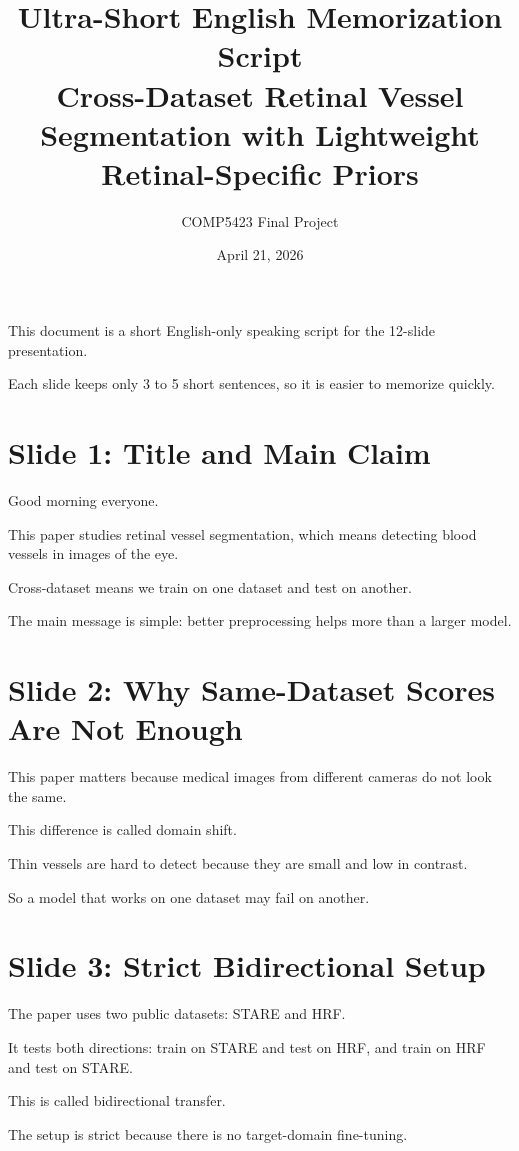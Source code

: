 \documentclass[12pt,a4paper]{article}
\title{Ultra-Short English Memorization Script\\[4pt]
\large Cross-Dataset Retinal Vessel Segmentation with Lightweight Retinal-Specific Priors}
\author{COMP5423 Final Project}
\date{April 21, 2026}
\begin{document}
\maketitle

This document is a short English-only speaking script for the 12-slide presentation.

Each slide keeps only 3 to 5 short sentences, so it is easier to memorize quickly.

\newpage

\section*{Slide 1: Title and Main Claim}

Good morning everyone.

This paper studies retinal vessel segmentation, which means detecting blood vessels in images of the eye.

Cross-dataset means we train on one dataset and test on another.

The main message is simple: better preprocessing helps more than a larger model.

\newpage

\section*{Slide 2: Why Same-Dataset Scores Are Not Enough}

This paper matters because medical images from different cameras do not look the same.

This difference is called domain shift.

Thin vessels are hard to detect because they are small and low in contrast.

So a model that works on one dataset may fail on another.

\newpage

\section*{Slide 3: Strict Bidirectional Setup}

The paper uses two public datasets: STARE and HRF.

It tests both directions: train on STARE and test on HRF, and train on HRF and test on STARE.

This is called bidirectional transfer.

The setup is strict because there is no target-domain fine-tuning.
\end{document}
